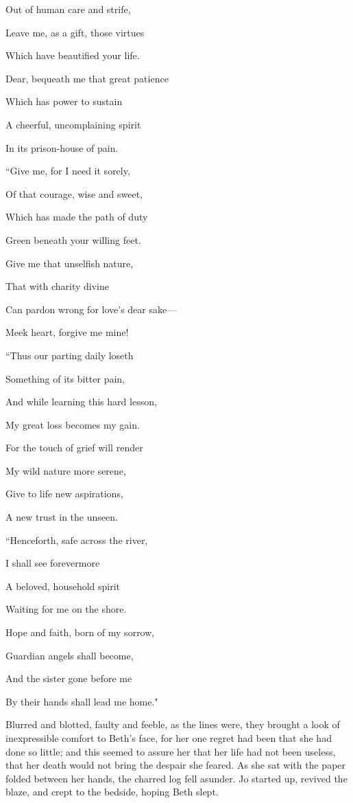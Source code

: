 Out of human care and strife,

Leave me, as a gift, those virtues

Which have beautified your life.

Dear, bequeath me that great patience

Which has power to sustain

A cheerful, uncomplaining spirit

In its prison-house of pain.

\hfill\break

``Give me, for I need it sorely,

Of that courage, wise and sweet,

Which has made the path of duty

Green beneath your willing feet.

Give me that unselfish nature,

That with charity divine

Can pardon wrong for love's dear sake---

Meek heart, forgive me mine!

\hfill\break

``Thus our parting daily loseth

Something of its bitter pain,

And while learning this hard lesson,

My great loss becomes my gain.

For the touch of grief will render

My wild nature more serene,

Give to life new aspirations,

A new trust in the unseen.

\hfill\break

``Henceforth, safe across the river,

I shall see forevermore

A beloved, household spirit

Waiting for me on the shore.

Hope and faith, born of my sorrow,

Guardian angels shall become,

And the sister gone before me

By their hands shall lead me home."

Blurred and blotted, faulty and feeble, as the lines were, they brought
a look of inexpressible comfort to Beth's face, for her
one regret had been that she had done so little; and this seemed to
assure her that her life had not been useless, that her death would not
bring the despair she feared. As she sat with the paper folded between
her hands, the charred log fell asunder. Jo started up, revived the
blaze, and crept to the bedside, hoping Beth slept.

